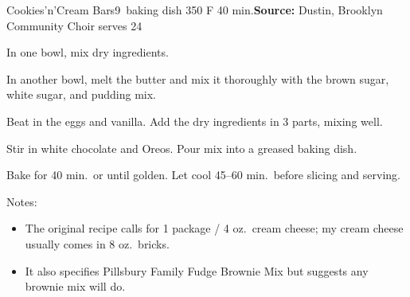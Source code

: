 \begin{recipe}{Cookies'n'Cream Bars}{9\inch{}\inch\ baking dish \hfill 350\0 F \hfill 40 min.}{\textbf{Source:} Dustin, Brooklyn Community Choir \hfill serves 24}

 In one bowl, mix dry ingredients.

 In another bowl, melt the butter and mix it thoroughly with the brown sugar, white sugar, and pudding mix.

 Beat in the eggs and vanilla. Add the dry ingredients in 3 parts, mixing well.

 Stir in white chocolate and Oreos. Pour mix into a greased baking dish.

 \newstep Bake for 40 min.\ or until golden. Let cool 45--60 min.\ before slicing and serving.

 \freeform Notes:
 \begin{itemize}
  \item The original recipe calls for 1 package / 4 oz.\ cream cheese; my cream cheese usually comes in 8 oz.\ bricks.
  \item It also specifies Pillsbury Family Fudge Brownie Mix but suggests any brownie mix will do.
 \end{itemize}
\end{recipe}
